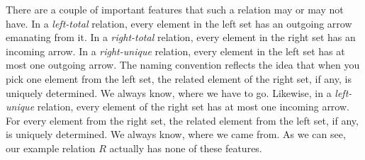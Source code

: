 \begin{figure}[h]
\centering
	
\end{figure}
There are a couple of important features that such a relation may or may not have. In a \emph{left-total} relation, every element in the left set has an outgoing arrow emanating from it. In a \emph{right-total} relation, every element in the right set has an incoming arrow. In a \emph{right-unique} relation, every element in the left set has at most one outgoing arrow. The naming convention reflects the idea that when you pick one element from the left set, the related  element of the right set, if any, is uniquely determined. We always know, where we have to go. Likewise, in a \emph{left-unique} relation, every element of the right set has at most one incoming arrow. For every element from the right set, the related element from the left set, if any, is uniquely determined. We always know, where we came from. As we can see, our example relation $R$ actually has none of these features.

